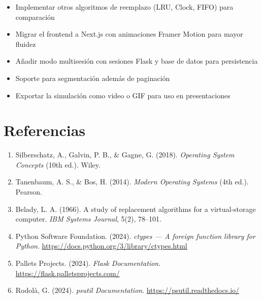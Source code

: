 \documentclass[12pt,a4paper]{article}
\begin{document}
\begin{itemize}[leftmargin=1.5cm]
  \item Implementar otros algoritmos de reemplazo (LRU, Clock, FIFO) para comparación
  \item Migrar el frontend a Next.js con animaciones Framer Motion para mayor fluidez
  \item Añadir modo multisesión con sesiones Flask y base de datos para persistencia
  \item Soporte para segmentación además de paginación
  \item Exportar la simulación como video o GIF para uso en presentaciones
\end{itemize}

\newpage

\section*{Referencias}

\begin{enumerate}[leftmargin=1.5cm]
  \item Silberschatz, A., Galvin, P. B., \& Gagne, G. (2018).
        \textit{Operating System Concepts} (10th ed.). Wiley.

  \item Tanenbaum, A. S., \& Bos, H. (2014).
        \textit{Modern Operating Systems} (4th ed.). Pearson.

  \item Belady, L. A. (1966). A study of replacement algorithms for a virtual-storage
        computer. \textit{IBM Systems Journal}, 5(2), 78–101.

  \item Python Software Foundation. (2024).
        \textit{ctypes — A foreign function library for Python}.
        \url{https://docs.python.org/3/library/ctypes.html}

  \item Pallets Projects. (2024). \textit{Flask Documentation}.
        \url{https://flask.palletsprojects.com/}

  \item Rodolà, G. (2024). \textit{psutil Documentation}.
        \url{https://psutil.readthedocs.io/}
\end{enumerate}
\end{document}
